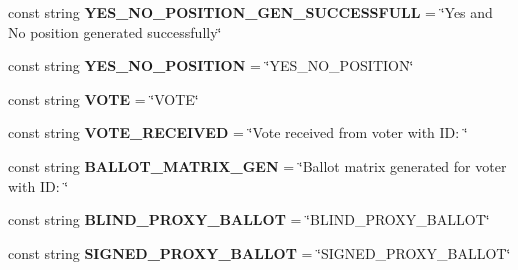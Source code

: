 \begin{DoxyCompactItemize}
\item 
\hypertarget{class_proxy_1_1_constants_a28f781b20c2b8f9efffefd96f92450d9}{}const string {\bfseries Y\+E\+S\+\_\+\+N\+O\+\_\+\+P\+O\+S\+I\+T\+I\+O\+N\+\_\+\+G\+E\+N\+\_\+\+S\+U\+C\+C\+E\+S\+S\+F\+U\+L\+L} = \char`\"{}Yes and No position generated successfully\char`\"{}\label{class_proxy_1_1_constants_a28f781b20c2b8f9efffefd96f92450d9}

\item 
\hypertarget{class_proxy_1_1_constants_a0aa35b3913a57ab090e586367cff8573}{}const string {\bfseries Y\+E\+S\+\_\+\+N\+O\+\_\+\+P\+O\+S\+I\+T\+I\+O\+N} = \char`\"{}Y\+E\+S\+\_\+\+N\+O\+\_\+\+P\+O\+S\+I\+T\+I\+O\+N\char`\"{}\label{class_proxy_1_1_constants_a0aa35b3913a57ab090e586367cff8573}

\item 
\hypertarget{class_proxy_1_1_constants_a5a3fd6ccf3d98956bc2ea45ef656e3c9}{}const string {\bfseries V\+O\+T\+E} = \char`\"{}V\+O\+T\+E\char`\"{}\label{class_proxy_1_1_constants_a5a3fd6ccf3d98956bc2ea45ef656e3c9}

\item 
\hypertarget{class_proxy_1_1_constants_a7b8ec3522a3a589762f88422d4b9ef5f}{}const string {\bfseries V\+O\+T\+E\+\_\+\+R\+E\+C\+E\+I\+V\+E\+D} = \char`\"{}Vote received from voter with I\+D\+: \char`\"{}\label{class_proxy_1_1_constants_a7b8ec3522a3a589762f88422d4b9ef5f}

\item 
\hypertarget{class_proxy_1_1_constants_a177c4978a58fb71fcb217ec325e4866e}{}const string {\bfseries B\+A\+L\+L\+O\+T\+\_\+\+M\+A\+T\+R\+I\+X\+\_\+\+G\+E\+N} = \char`\"{}Ballot matrix generated for voter with I\+D\+: \char`\"{}\label{class_proxy_1_1_constants_a177c4978a58fb71fcb217ec325e4866e}

\item 
\hypertarget{class_proxy_1_1_constants_acf0e5cb137a37106890471f9ee9a8eec}{}const string {\bfseries B\+L\+I\+N\+D\+\_\+\+P\+R\+O\+X\+Y\+\_\+\+B\+A\+L\+L\+O\+T} = \char`\"{}B\+L\+I\+N\+D\+\_\+\+P\+R\+O\+X\+Y\+\_\+\+B\+A\+L\+L\+O\+T\char`\"{}\label{class_proxy_1_1_constants_acf0e5cb137a37106890471f9ee9a8eec}

\item 
\hypertarget{class_proxy_1_1_constants_aa1e65c50923c099370b7273ca42c0b34}{}const string {\bfseries S\+I\+G\+N\+E\+D\+\_\+\+P\+R\+O\+X\+Y\+\_\+\+B\+A\+L\+L\+O\+T} = \char`\"{}S\+I\+G\+N\+E\+D\+\_\+\+P\+R\+O\+X\+Y\+\_\+\+B\+A\+L\+L\+O\+T\char`\"{}\label{class_proxy_1_1_constants_aa1e65c50923c099370b7273ca42c0b34}


\end{DoxyCompactItemize}
